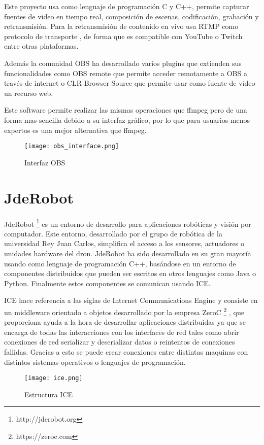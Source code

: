 Este proyecto usa como lenguaje de programación C y C++, permite capturar fuentes de video en tiempo real, composición de escenas, codificación, grabación y retransmisión. Para la retransmisión de contenido en vivo usa RTMP como protocolo de transporte , de forma que es compatible con YouTube o Twitch entre otras plataformas.

Además la comunidad OBS ha desarrollado varios plugins que extienden sus funcionalidades como OBS remote que permite acceder remotamente a OBS a través de internet o CLR Browser Source que permite usar como fuente de vídeo un recurso web.

Este software permite realizar las mismas operaciones que ffmpeg pero de una forma mas sencilla debido a su interfaz gráfico, por lo que para usuarios menos expertos es una mejor alternativa que ffmpeg.

\begin{figure}[H]
    \centering
    \texttt{[image: obs\_interface.png]}
    \caption{Interfaz OBS}
\end{figure}



\section{JdeRobot}

JdeRobot \footnote{http://jderobot.org}  es un entorno de desarrollo para  aplicaciones robóticas y visión por computador. Este entorno, desarrollado por el grupo de robótica de la universidad Rey Juan Carlos, simplifica el acceso a los sensores, actuadores o unidades hardware del dron. JdeRobot ha sido desarrollado en su gran mayoría usando como lenguaje de programación C++, basándose en un entorno de componentes distribuidos que pueden ser escritos en otros lenguajes como Java o Python. Finalmente estos componentes se comunican usando ICE. 

ICE hace referencia a las siglas de Internet Communications Engine y consiste en un middleware orientado a objetos desarrollado por la empresa ZeroC \footnote{https://zeroc.com} , que proporciona ayuda a la hora de desarrollar aplicaciones distribuidas ya que se encarga de todas las interacciones con los interfaces de red tales como abrir conexiones de red serializar y deserializar datos o reintentos de conexiones fallidas. Gracias a esto se puede crear conexiones entre distintas maquinas con distintos sistemas operativos o lenguajes de programación.

\begin{figure}[H]
    \centering
    \texttt{[image: ice.png]}
    \caption{Estructura ICE}
\end{figure}

